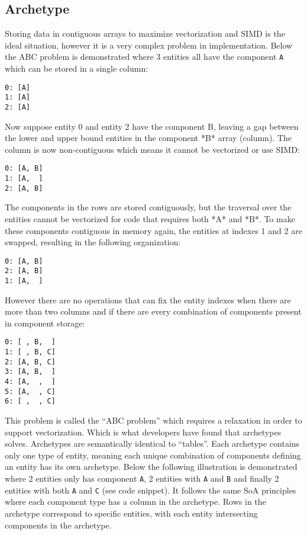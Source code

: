 \documentclass[openany, amssymb, psamsfonts]{amsart}
\theoremstyle{definition}
\numberwithin{equation}{section}
\begin{document}
\subsection{Archetype}
Storing data in contiguous arrays to maximize vectorization and SIMD is the ideal situation, 
however it is a very complex problem in implementation. Below the ABC problem\cite{ABC} 
is demonstrated where 3 entities all have the component \texttt{A} which can be stored in a single 
column:

\begin{verbatim}
0: [A]
1: [A]
2: [A]
\end{verbatim}

Now suppose entity 0 and entity 2 have the component B, leaving a gap between the lower and upper bound entities in the component *B* array (column). The column is now non-contiguous which means it cannot be vectorized or use SIMD:

\begin{verbatim}
0: [A, B]
1: [A,  ]
2: [A, B]
\end{verbatim}

The components in the rows are stored contiguously, but the traversal over the entities cannot be vectorized for code that requires both *A* and *B*. To make these components contiguous in memory again, the entities at indexes 1 and 2 are swapped, resulting in the following organization:

\begin{verbatim}
0: [A, B]
2: [A, B]
1: [A,  ]
\end{verbatim}

However there are no operations that can fix the entity indexes when there are more than two columns and if there are every combination of components present in component storage:

\begin{verbatim}
0: [ , B,  ]
1: [ , B, C]
2: [A, B, C]
3: [A, B,  ]
4: [A,  ,  ] 
5: [A,  , C]
6: [ ,  , C]
\end{verbatim}

This problem is called the ``ABC problem'' which requires a relaxation in order to support 
vectorization. Which is what developers have found that archetypes solves.\cite{Anderson} 
Archetypes are semantically identical to ``tables''. Each archetype contains only one type of 
entity, meaning each unique combination of components defining an entity has its own archetype. 
Below the following illustration is demonstrated where 2 entities only has component \texttt{A}, 
2 entities with \texttt{A} and \texttt{B} and finally 2 entities with both \texttt{A} 
and \texttt{C} (see code snippet). It follows the same SoA principles where each component 
type has a column in the archetype. Rows in the archetype correspond to specific entities, with each entity intersecting components in the archetype. 
\end{document}

